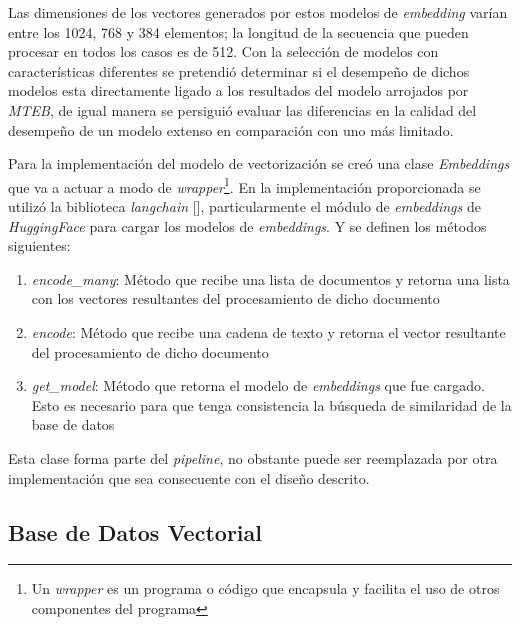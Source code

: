         Las dimensiones de los vectores generados por estos modelos de \emph{embedding} varían entre los 1024, 768 y 384 elementos; la longitud de la secuencia que pueden procesar en todos los casos es de 512. Con la selección de modelos con características diferentes se pretendió determinar si el desempeño de dichos modelos esta directamente ligado a los resultados del modelo arrojados por \emph{MTEB}, de igual manera se persiguió evaluar las diferencias en la calidad del desempeño de un modelo extenso en comparación con uno más limitado.

    Para la implementación del modelo de vectorización se creó una clase \emph{Embeddings} que va a actuar a modo de \emph{wrapper}\footnote{Un \emph{wrapper} es un programa o código que encapsula y facilita el uso de otros componentes del programa}. En la implementación proporcionada se utilizó la biblioteca \emph{langchain} [\cite{langchain}], particularmente el módulo de \emph{embeddings} de \emph{HuggingFace} para cargar los modelos de \emph{embeddings}. Y se definen los métodos siguientes:
    \begin{enumerate}
        \item \emph{encode\_many}: Método que recibe una lista de documentos y retorna una lista con los vectores resultantes del procesamiento de dicho documento
        \item \emph{encode}: Método que recibe una cadena de texto y retorna el vector resultante del procesamiento  de dicho documento 
        \item \emph{get\_model}: Método que retorna el modelo de \emph{embeddings} que fue cargado. Esto es necesario para que tenga consistencia la búsqueda de similaridad de la base de datos
    \end{enumerate}

    Esta clase forma parte del \emph{pipeline}, no obstante puede ser reemplazada por otra implementación que sea consecuente con el diseño descrito.

    \subsection{Base de Datos Vectorial}
